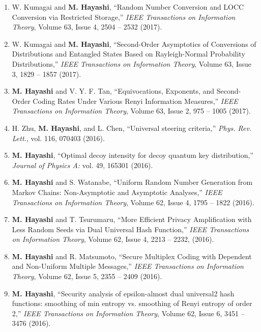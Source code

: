 \documentclass[a4paper,12pt,oneside]{article}
\begin{document}
\begin{enumerate}
\item 
W. Kumagai and \textbf{M. Hayashi}, ``Random Number Conversion and LOCC Conversion via Restricted Storage,'' 
{\em IEEE Transactions on Information Theory},
Volume 63, Issue 4, 2504 -- 2532 (2017). 

\item 
W. Kumagai and \textbf{M. Hayashi}, ``Second-Order Asymptotics of Conversions of Distributions and Entangled States Based on Rayleigh-Normal Probability Distributions,'' 
{\em IEEE Transactions on Information Theory}, Volume 63, Issue 3, 1829 -- 1857 (2017). 

\item 
\textbf{M. Hayashi} and V. Y. F. Tan, ``Equivocations, Exponents, and Second-Order Coding Rates Under Various Renyi Information Measures,'' 
{\em IEEE Transactions on Information Theory}, Volume 63, Issue 2, 975 -- 1005 (2017). 

\item 
H. Zhu, \textbf{M. Hayashi}, and L. Chen, ``Universal steering criteria,'' 
{\em Phys. Rev. Lett.}, vol. 116, 070403 (2016). 

\item 
\textbf{M. Hayashi}, 
``Optimal decoy intensity for decoy quantum key distribution,'' 
{\em Journal of Physics A:} vol. 49, 165301 (2016). 

\item 
\textbf{M. Hayashi} and S. Watanabe, ``Uniform Random Number Generation from Markov Chains: Non-Asymptotic and Asymptotic Analyses,'' 
{\em IEEE Transactions on Information Theory}, Volume 62, Issue 4, 1795 -- 1822 (2016). 

\item 
\textbf{M. Hayashi} and T. Tsurumaru, ``More Efficient Privacy Amplification with Less Random Seeds via Dual Universal Hash Function,'' 
{\em IEEE Transactions on Information Theory}, 
Volume 62, Issue 4, 2213 -- 2232, (2016). 

\item 
\textbf{M. Hayashi} and R. Matsumoto, ``Secure Multiplex Coding with Dependent and Non-Uniform Multiple Messages,'' 
{\em IEEE Transactions on Information Theory}, Volume 62, Issue 5, 2355 -- 2409 (2016). 

\item 
\textbf{M. Hayashi}, ``Security analysis of epsilon-almost dual universal2 hash functions: smoothing of min entropy vs. smoothing of Renyi entropy of order 2,'' 
{\em IEEE Transactions on Information Theory}, Volume 62, Issue 6, 3451 -- 3476 (2016). 


\end{enumerate}
\end{document}
